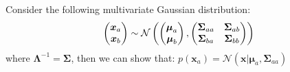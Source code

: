 \begin{proposition}
    Consider the following multivariate Gaussian distribution:
    \begin{equation*}
        \begin{pmatrix}
            \boldsymbol x_a \\ \boldsymbol x_b
        \end{pmatrix} \sim \mathcal{N}\left( \begin{pmatrix}
            \boldsymbol \mu_a  \\ \boldsymbol \mu_b
        \end{pmatrix}, \begin{pmatrix}
            \boldsymbol \Sigma_{aa} & \boldsymbol \Sigma_{ab} \\
            \boldsymbol \Sigma_{ba} & \boldsymbol \Sigma_{bb} \\
        \end{pmatrix} \right)
    \end{equation*}
    where $\boldsymbol \Lambda^{-1} = \boldsymbol \Sigma$, then we can show that: $p(\boldsymbol x_a) = \mathcal{N}(\boldsymbol x | \boldsymbol \mu_a, \boldsymbol \Sigma_{aa})$
\end{proposition}
